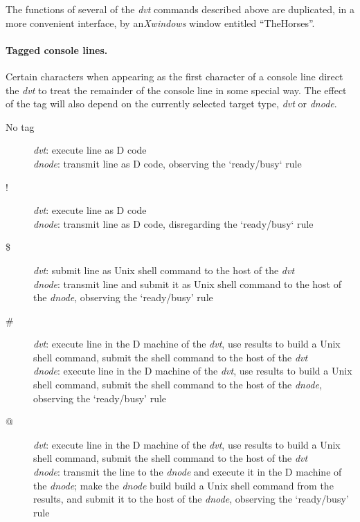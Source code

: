 The functions of several of the \emph{dvt} commands described above are duplicated, in a more convenient interface, by an\emph{Xwindows} window entitled ``TheHorses''.

\paragraph{Tagged console lines.} Certain characters when appearing as the first character of a console line direct the \emph{dvt} to treat the remainder of the console line in some special way. The effect of the tag will also depend on the currently selected target type, \emph{dvt} or \emph{dnode}.

\begin{description}
\item[No tag] \emph{dvt}: execute line as D code\\
              \emph{dnode}: transmit line as D code, observing the `ready/busy` rule\\
\item[!] \emph{dvt}: execute line as D code\\
         \emph{dnode}: transmit line as D code, disregarding the `ready/busy` rule\\ 
\item[\$] \emph{dvt}: submit line as Unix shell command to the host of the \emph{dvt}\\
          \emph{dnode}: transmit line and submit it as Unix shell command to the host of the \emph{dnode}, observing the `ready/busy' rule\\
\item[\#] \emph{dvt}: execute line in the D machine of the \emph{dvt}, use results to build a Unix shell command, submit the shell command to the host of the \emph{dvt}\\
          \emph{dnode}: execute line in the D machine of the \emph{dvt}, use results to build a Unix shell command, submit the shell command to the host of the \emph{dnode}, observing the `ready/busy' rule\\
\item[@] \emph{dvt}: execute line in the D machine of the \emph{dvt}, use results to build a Unix shell command, submit the shell command to the host of the \emph{dvt}\\
         \emph{dnode}: transmit the line to the \emph{dnode} and execute it in the D machine of the \emph{dnode}; make the \emph{dnode} build build a Unix shell command from the results, and submit it to the host of the \emph{dnode}, observing the `ready/busy' rule
\end{description}

